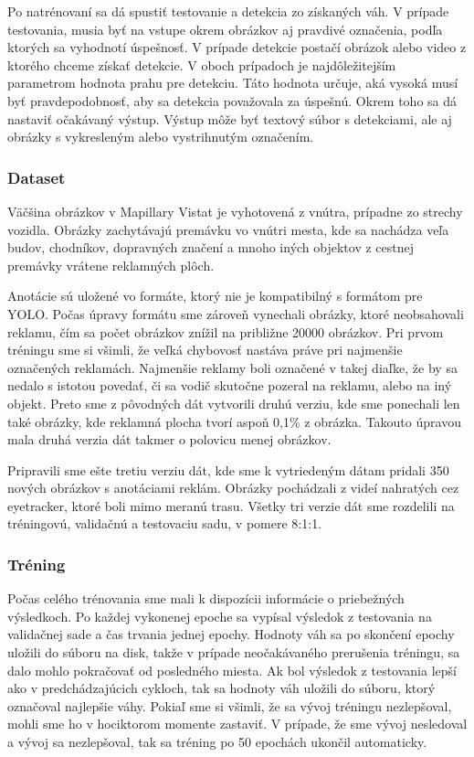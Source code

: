 Po natrénovaní sa dá spustiť testovanie a detekcia zo získaných váh. V prípade testovania, musia byť na vstupe okrem obrázkov aj pravdivé označenia, podľa ktorých sa vyhodnotí úspešnosť. V prípade detekcie postačí obrázok alebo video z ktorého chceme získať detekcie. V oboch prípadoch je najdôležitejším parametrom hodnota prahu pre detekciu. Táto hodnota určuje, aká vysoká musí byť pravdepodobnosť, aby sa detekcia považovala za úspešnú. Okrem toho sa dá nastaviť očakávaný výstup. Výstup môže byť textový súbor s detekciami, ale aj obrázky s vykresleným alebo vystrihnutým označením.

\subsubsection{Dataset}

Väčšina obrázkov v Mapillary Vistat je vyhotovená z vnútra, prípadne zo strechy vozidla. Obrázky zachytávajú premávku vo vnútri mesta, kde sa nachádza veľa budov, chodníkov, dopravných značení a mnoho iných objektov z cestnej premávky vrátene reklamných plôch.

Anotácie sú uložené vo formáte, ktorý nie je kompatibilný s formátom pre YOLO. Počas úpravy formátu sme zároveň vynechali obrázky, ktoré neobsahovali reklamu, čím sa počet obrázkov znížil na približne 20000 obrázkov. Pri prvom tréningu sme si všimli, že veľká chybovosť nastáva práve pri najmenšie označených reklamách. Najmenšie reklamy boli označené v takej diaľke, že by sa nedalo s istotou povedať, či sa vodič skutočne pozeral na reklamu, alebo na iný objekt. Preto sme z pôvodných dát vytvorili druhú verziu, kde sme ponechali len také obrázky, kde reklamná plocha tvorí aspoň 0,1\% z obrázka. Takouto úpravou mala druhá verzia dát takmer o polovicu menej obrázkov.

Pripravili sme ešte tretiu verziu dát, kde sme k vytriedeným dátam pridali 350 nových obrázkov s anotáciami reklám. Obrázky pochádzali z videí nahratých cez eyetracker, ktoré boli mimo meranú trasu. Všetky tri verzie dát sme rozdelili na tréningovú, validačnú a testovaciu sadu, v pomere 8:1:1.

\subsubsection{Tréning}

Počas celého trénovania sme mali k dispozícii informácie o priebežných výsledkoch. Po každej vykonenej epoche sa vypísal výsledok z testovania na validačnej sade a čas trvania jednej epochy. Hodnoty váh sa po skončení epochy uložili do súboru na disk, takže v prípade neočakávaného prerušenia tréningu, sa dalo mohlo pokračovať od posledného miesta. Ak bol výsledok z testovania lepší ako v predchádzajúcich cykloch, tak sa hodnoty váh uložili do súboru, ktorý označoval najlepšie váhy. Pokiaľ sme si všimli, že sa vývoj tréningu nezlepšoval, mohli sme ho v hociktorom momente zastaviť. V prípade, že sme vývoj nesledoval a vývoj sa nezlepšoval, tak sa tréning po 50 epochách ukončil automaticky.

